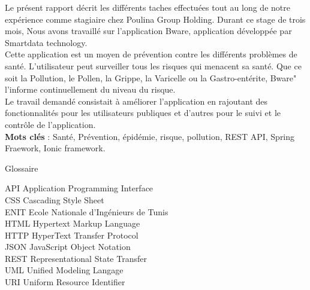 \documentclass[11pt,fleqn]{book} %
\begin{document}
	Le présent rapport décrit les différents taches effectuées tout au long de notre expérience comme stagiaire chez Poulina Group Holding. Durant ce stage de trois mois, Nous avons travaillé sur l'application Bware, application développée par Smartdata technology.\\
	Cette application est un moyen de prévention contre les différents problèmes de santé. L'utilisateur peut surveiller tous les risques qui menacent sa santé. Que ce soit la Pollution, le Pollen, la Grippe, la Varicelle ou la Gastro-entérite, Bware" l'informe continuellement du niveau du risque.\\
	
	Le travail demandé consistait à améliorer l'application en rajoutant des fonctionnalités pour les utilisateurs publiques et d'autres pour le suivi et le contrôle de l'application.\\
	
	\textbf{Mots clés} : Santé, Prévention, épidémie, risque, pollution, REST API, Spring Fraework, Ionic framework.\\
	
	

	\newpage
	\vspace*{4cm}	
	{\LARGE Glossaire}
	
	\vspace*{1cm}
	\begin{flushleft}
		API Application Programming Interface\\
		CSS Cascading Style Sheet\\
		ENIT Ecole Nationale d’Ingénieurs de Tunis\\
		HTML Hypertext Markup Language\\
		HTTP HyperText Transfer Protocol\\
		JSON JavaScript Object Notation\\
		REST Representational State Transfer\\
		UML Unified Modeling Langage\\
		URI Uniform Resource Identifier\\
	\end{flushleft}

	\newpage
	\let\cleardoublepage\clearpage
	\renewcommand\listfigurename{Liste des figures}
	\listoffigures
	
\end{document}
